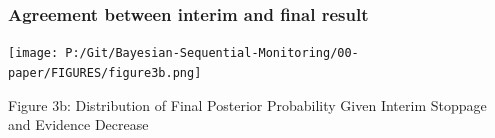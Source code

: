\documentclass[12pt]{article}
\begin{document}
\subsubsection{Agreement between interim and final result}
\begin{center}
\texttt{[image: P:/Git/Bayesian-Sequential-Monitoring/00-paper/FIGURES/figure3b.png]}

Figure 3b: Distribution of Final Posterior Probability Given Interim Stoppage and Evidence Decrease
\end{center}


\end{document}
